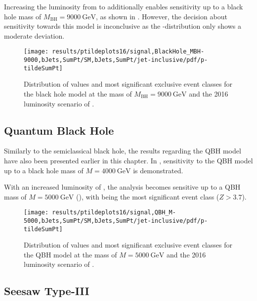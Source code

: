 Increasing the luminosity from \lumiA to \lumiB additionally enables sensitivity up to a black hole mass of $M_\text{BH} = \SI{9000}{\GeV}$, as shown in . However, the decision about sensitivity towards this model is inconclusive as the \ptilde-distribution only shows a moderate deviation. 
\begin{figure}[p]
    \centering
    \texttt{[image: results/ptildeplots16/signal,BlackHole\_MBH-9000,bJets,SumPt/SM,bJets,SumPt/jet-inclusive/pdf/p-tildeSumPt]}
    {
        
    }
    \caption{Distribution of \ptilde values and most significant exclusive event classes for the black hole model at the mass of $M_\text{BH} = \SI{9000}{\GeV}$ and the 2016 luminosity scenario of \lumiB.}
    \label{fig:result_bh_9000}
\end{figure}

\subsection{Quantum Black Hole}
\label{sec:results_qbh}

Similarly to the semiclassical black hole, the results regarding the \ac{QBH} model have also been presented earlier in this chapter. In , sensitivity to the \ac{QBH} model up to a black hole mass of $M = \SI{4000}{\GeV}$ is demonstrated.

With an increased luminosity of \lumiB, the analysis becomes sensitive up to a \ac{QBH} mass of  $M = \SI{5000}{\GeV}$ (), with  being the most significant event class ($Z > \num{3.7}$).

\begin{figure}[p]
    \centering
    \texttt{[image: results/ptildeplots16/signal,QBH\_M-5000,bJets,SumPt/SM,bJets,SumPt/jet-inclusive/pdf/p-tildeSumPt]}
    {
        
    }
    \caption{Distribution of \ptilde values and most significant exclusive event classes for the \acl{QBH} model at the mass of $M = \SI{5000}{\GeV}$ and the 2016 luminosity scenario of \lumiB.}
    \label{fig:result_qbh_5000}
\end{figure}


\subsection{Seesaw Type-III}
\label{sec:results_seesaw}

